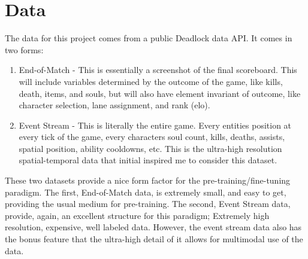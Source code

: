 \documentclass[11pt]{article}
\begin{document}
\section{Data}
    The data for this project comes from a public Deadlock data API. It comes in two forms:
    \begin{enumerate}
        \item End-of-Match - This is essentially a screenshot of the final scoreboard. This will include variables determined by the outcome of the game, like kills, death, items, and souls, but will also have element invariant of outcome, like character selection, lane assignment, and rank (elo).
        \item Event Stream - This is literally the entire game. Every entities position at every tick of the game, every characters soul count, kills, deaths, assists, spatial position, ability cooldowns, etc. This is the ultra-high resolution spatial-temporal data that initial inspired me to consider this dataset.
    \end{enumerate}
    These two datasets provide a nice form factor for the pre-training/fine-tuning paradigm. The first, End-of-Match data, is extremely small, and easy to get, providing the usual medium for pre-training. The second, Event Stream data, provide, again, an excellent structure for this paradigm; Extremely high resolution, expensive, well labeled data. However, the event stream data also has the bonus feature that the ultra-high detail of it allows for multimodal use of the data.



\newpage 
\end{document}
